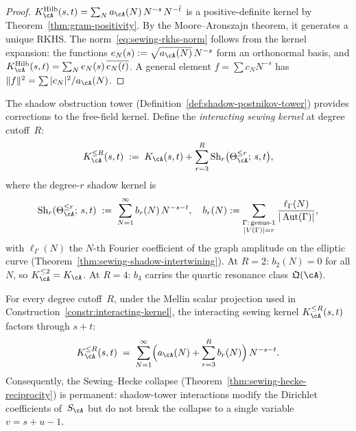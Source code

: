 \begin{proof}
$K_\cA^{\mathrm{Hilb}}(s,t)
= \sum_N a_\cA(N)\,N^{-s}\,N^{-\bar{t}}$
is a positive-definite kernel by
Theorem~\ref{thm:gram-positivity}.
By the Moore--Aronszajn theorem, it generates a unique
RKHS. The norm~\eqref{eq:sewing-rkhs-norm} follows from
the kernel expansion: the functions
$e_N(s) := \sqrt{a_\cA(N)}\,N^{-s}$ form an orthonormal
basis, and
$K_\cA^{\mathrm{Hilb}}(s,t)
= \sum_N e_N(s)\,\overline{e_N(t)}$.
A general element $f = \sum c_N N^{-s}$ has
$\|f\|^2 = \sum |c_N|^2/a_\cA(N)$.
\end{proof}

\begin{construction}%
\label{constr:interacting-kernel}%
%
%
The shadow obstruction tower
(Definition~\ref{def:shadow-postnikov-tower})
provides corrections to the free-field kernel.
Define the \emph{interacting sewing kernel} at degree
cutoff~$R$:
\begin{equation}\label{eq:interacting-kernel}
K_\cA^{\leq R}(s,t)
\;:=\;
K_\cA(s,t)
+ \sum_{r=3}^{R}
\operatorname{Sh}_r\bigl(\Theta_\cA^{\leq r};\,s,t\bigr),
\end{equation}
where the degree-$r$ shadow kernel is
\begin{equation}\label{eq:shadow-kernel-mellin}
\operatorname{Sh}_r(\Theta_\cA^{\leq r};\,s,t)
\;:=\;
\sum_{N=1}^\infty b_r(N)\,N^{-s-t},
\quad
b_r(N) := \sum_{\substack{\Gamma:\,\text{genus-1}\\
|V(\Gamma)|=r}}
\frac{\ell_\Gamma(N)}{|\operatorname{Aut}(\Gamma)|},
\end{equation}
with $\ell_\Gamma(N)$ the $N$-th Fourier coefficient of
the graph amplitude on the elliptic curve
(Theorem~\ref{thm:sewing-shadow-intertwining}).
At $R = 2$: $b_2(N) = 0$ for all $N$, so
$K_\cA^{\leq 2} = K_\cA$.
At $R = 4$: $b_4$ carries the quartic resonance class
$\mathfrak{Q}(\cA)$.
\end{construction}

\begin{proposition}%
\label{prop:collapse-permanence}%
%
%
For every degree cutoff~$R$, under the Mellin scalar projection used
in Construction~\ref{constr:interacting-kernel}, the interacting
sewing kernel
$K_\cA^{\leq R}(s,t)$ factors through $s{+}t$:
\begin{equation}\label{eq:collapse-permanence}
K_\cA^{\leq R}(s,t)
\;=\;
\sum_{N=1}^\infty
\Bigl(a_\cA(N) + \sum_{r=3}^{R}b_r(N)\Bigr)\,N^{-s-t}.
\end{equation}
Consequently, the Sewing--Hecke collapse
\textup{(}Theorem~\textup{\ref{thm:sewing-hecke-reciprocity}}\textup{)}
is permanent: shadow-tower interactions modify the Dirichlet
coefficients of~$S_\cA$ but do not break the collapse
to a single variable $v = s{+}u{-}1$.
\end{proposition}

